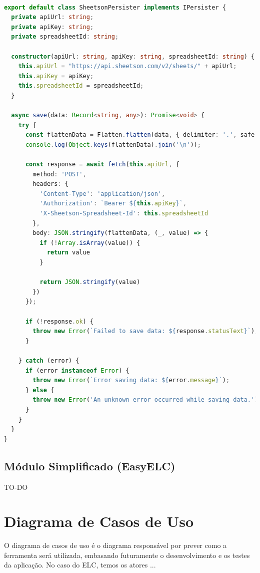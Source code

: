 \documentclass[12pt]{tcc}
\begin{document}
\begin{lstlisting}[label={lst:sheetson_class}, caption={Implementação da classe responsável pela persistência dos dados usando o Sheetson.}, language=TypeScript, breaklines=true]

export default class SheetsonPersister implements IPersister {
  private apiUrl: string;
  private apiKey: string;
  private spreadsheetId: string;

  constructor(apiUrl: string, apiKey: string, spreadsheetId: string) {
    this.apiUrl = "https://api.sheetson.com/v2/sheets/" + apiUrl;
    this.apiKey = apiKey;
    this.spreadsheetId = spreadsheetId;
  }

  async save(data: Record<string, any>): Promise<void> {
    try {
      const flattenData = Flatten.flatten(data, { delimiter: '.', safe: true });
      console.log(Object.keys(flattenData).join('\n'));
      
      const response = await fetch(this.apiUrl, {
        method: 'POST',
        headers: {
          'Content-Type': 'application/json',
          'Authorization': `Bearer ${this.apiKey}`,
          'X-Sheetson-Spreadsheet-Id': this.spreadsheetId
        },
        body: JSON.stringify(flattenData, (_, value) => {
          if (!Array.isArray(value)) {
            return value
          }

          return JSON.stringify(value)
        })
      });

      if (!response.ok) {
        throw new Error(`Failed to save data: ${response.statusText}`);
      }

    } catch (error) {
      if (error instanceof Error) {
        throw new Error(`Error saving data: ${error.message}`);
      } else {
        throw new Error('An unknown error occurred while saving data.');
      }
    }
  }
}
\end{lstlisting}
\subsection{Módulo Simplificado (EasyELC)}
TO-DO


\section{Diagrama de Casos de Uso}
\label{sec:diagrama_de_caso_de_uso}

O diagrama de casos de uso é o diagrama responsável por prever como a ferramenta será utilizada, embasando futuramente o desenvolvimento e os testes da aplicação. No caso do ELC, temos os atores ...
\end{document}
